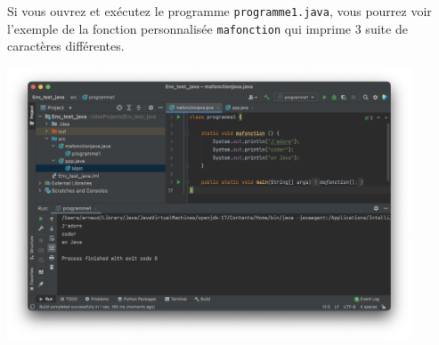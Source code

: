 Si vous ouvrez et exécutez le programme \lstinline{programme1.java}, vous pourrez voir l'exemple de la fonction personnalisée \lstinline{mafonction} qui imprime 3 suite de caractères différentes.

\begin{center}
\includegraphics[width=12cm]{fonction}		
\end{center}



